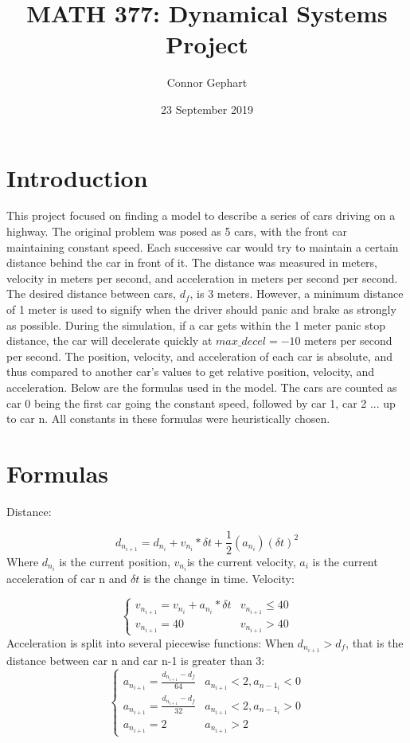 \documentclass[12pt]{extarticle}
\title{MATH 377: Dynamical Systems Project}
\author{Connor Gephart}
\date{23 September 2019}
\begin{document}
\maketitle
\section{Introduction}
This project focused on finding a model to describe a series of cars driving on a highway. The original problem was posed as 5 cars, with the front car maintaining constant speed. Each successive car would try to maintain a certain distance behind the car in front of it. 
The distance was measured in meters, velocity in meters per second, and acceleration in meters per second per second. The desired distance between cars, $d_f$, is 3 meters. However, a minimum distance of 1 meter is used to signify when the driver should panic and brake as strongly as possible. During the simulation, if a car gets within the 1 meter panic stop distance, the car will decelerate quickly at $max\_decel = -10$ meters per second per second. The position, velocity, and acceleration of each car is absolute, and thus compared to another car's values to get relative position, velocity, and acceleration.
\newline
\newline
Below are the formulas used in the model. The cars are counted as car 0 being the first car going the constant speed, followed by car 1, car 2 ... up to car n. All constants in these formulas were heuristically chosen. 
\section{Formulas}
Distance:

\[ d_{n_{i+1}} = d_{n_i} + v_{n_i} * \delta t + \frac{1}{2}(a_{n_i})(\delta t)^2\]
Where $d_{n_i}$ is the current position, $v_{n_i}$is the current velocity, $a_i$ is the current acceleration of car n and $ \delta t$ is the change in time. 
\newline
\newline
Velocity:

\[ \begin{cases}
    v_{n_{i+1}} = v_{n_i} + a_{n_i} * \delta t & v_{n_{i+1}} \leq 40 \\
    v_{n_{i+1}} = 40 & v_{n_{i+1}} > 40
    \end{cases}
\]
\newline
Acceleration is split into several piecewise functions:
\newline
\newline
\newline
When $d_{n_{i+1}} > d_f$, that is the distance between car n and car n-1 is greater than 3:
\[ \begin{cases} 
      a_{n_{i+1}} = \frac{d_{n_{i+1}} - d_f}{64} & a_{n_{i+1}} < 2,  a_{{n-1}_i} < 0\\
      a_{n_{i+1}} = \frac{d_{n_{i+1}} - d_f}{32} & a_{n_{i+1}} < 2,  a_{{n-1}_i} > 0 \\
      a_{n_{i+1}} = 2 & a_{n_{i+1}} > 2
   \end{cases}
\]
\end{document}
